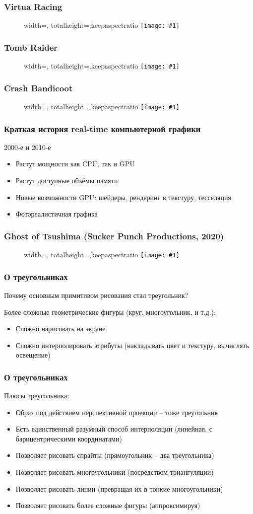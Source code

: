 \documentclass{beamer}
\newcommand{\slideimage}[1]{
  \begin{figure}
    \begin{adjustbox}{width=\textwidth, totalheight=\textheight-2\baselineskip-2\baselineskip,keepaspectratio}
      \texttt{[image: \#1]}
    \end{adjustbox}
  \end{figure}
}
\begin{document}
\begin{frame}
\frametitle{Virtua Racing}
\slideimage{racing.png}
\end{frame}


\begin{frame}
\frametitle{Tomb Raider}
\slideimage{tomb-raider.png}
\end{frame}


\begin{frame}
\frametitle{Crash Bandicoot}
\slideimage{crash.jpg}
\end{frame}

\begin{frame}
\frametitle{Краткая история real-time компьютерной графики}
\centerline{2000-е и 2010-е}
\pause
\begin{itemize}
\item Растут мощности как CPU, так и GPU
\pause
\item Растут доступные объёмы памяти
\pause
\item Новые возможности GPU: шейдеры, рендеринг в текстуру, тесселяция
\pause
\item Фотореалистичная графика
\end{itemize}
\end{frame}

\begin{frame}
\frametitle{Ghost of Tsushima (Sucker Punch Productions, 2020)}
\slideimage{ghost.jpg}
\end{frame}

\begin{frame}
\frametitle{О треугольниках}
Почему основным примитивом рисования стал треугольник?
\pause

Более сложные геометрические фигуры (круг, многоугольник, и т.д.):
\pause
\begin{itemize}
\item Сложно нарисовать на экране
\pause
\item Сложно интерполировать атрибуты (накладывать цвет и текстуру, вычислять освещение)
\end{itemize}
\end{frame}

\begin{frame}
\frametitle{О треугольниках}
Плюсы треугольника:
\pause
\begin{itemize}
\item Образ под действием перспективной проекции -- тоже треугольник
\pause
\item Есть единственный разумный способ интерполяции (линейная, с барицентрическими координатами)
\pause
\item Позволяет рисовать спрайты (прямоугольник -- два треугольника)
\pause
\item Позволяет рисовать многоугольники (посредством триангуляции)
\pause
\item Позволяет рисовать линии (превращая их в тонкие многоугольники)
\pause
\item Позволяет рисовать более сложные фигуры (аппроксимируя)
\end{itemize}
\end{frame}
\end{document}
